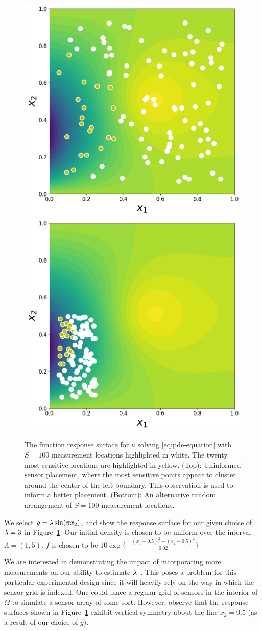 \begin{figure}
\centering
  \includegraphics[width=0.475\linewidth]{figures/pde/pde_reference_solution}
  \includegraphics[width=0.475\linewidth]{figures/pde/pde-alt_reference_solution}
\caption{The function response surface for $u$ solving \eqref{eq:pde-equation} with $S=100$ measurement locations highlighted in white.
The twenty most sensitive locations are highlighted in yellow.
(Top): Uninformed sensor placement, where the most sensitive points  appear to cluster around the center of the  left boundary.
This observation is used to inform a better placement.
(Bottom): An alternative random arrangement of $S=100$ measurement locations.
}
\label{fig:pde-ref-solution}
\end{figure}
We select $g=\lambda \sin(\pi x_2)$, and show the response surface for our given choice of $\lambda = 3$ in Figure~\ref{fig:pde-ref-solution}.
Our initial density is chosen to be uniform over the interval $\Lambda = (1,5)$.
$f$ is chosen to be $10\exp\{-\frac{(x_1-0.5)^2 + (x_2 - 0.5)^2}{0.02}\}$


We are interested in demonstrating the impact of incorporating more measurements on our ability to estimate $\lambda^\dagger$.
This poses a problem for this particular experimental design since it will heavily rely on the way in which the sensor grid is indexed.
One could place a regular grid of sensors in the interior of $\Omega$ to simulate a sensor array of some sort.
However, observe that the response surfaces shown in Figure~\ref{fig:pde-ref-solution} exhibit vertical symmetry about the line $x_2=0.5$ (as a result of our choice of $g$).


